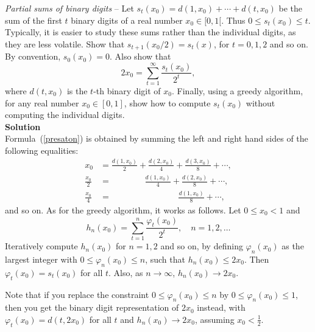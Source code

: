 \documentclass[oneside,10pt]{book}
\begin{document}
\begin{Exercise}\label{kn5z21990fr} {\em Partial sums of binary digits} --  Let $s_t(x_0) = d(1,x_0) +\cdots + d(t,x_0)$ be the sum of the first $t$ binary digits of a real number $x_0\in [0, 1[$. Thus $0\leq s_t(x_0)\leq t$. Typically, it is easier to study these sums rather than the individual digits, as they are less volatile.  Show that $s_{t+1}(x_0/2) = s_t(x)$, for $t=0,1,2$ and so on.  By convention, $s_0(x_0)=0$. Also show that 
\begin{equation}
 2x_0 = \sum_{t=1}^\infty \frac{s_t(x_0)}{2^t}, \label{presaton}
\end{equation}
where $d(t,x_0)$ is the $t$-th binary digit of $x_0$. Finally, using a \textcolor{index}{greedy algorithm}, for any real number $x_0\in[0, 1]$, show how to compute $s_t(x_0)$ without computing the individual digits.\vspace{1ex} \\ 
{\bf Solution} \\
Formula~(\ref{presaton}) is obtained by summing the left and right hand sides of the following equalities:
\begin{align}
x_0 & = \frac{d(1,x_0)}{2} +  \frac{d(2,x_0)}{4}+ \frac{d(3,x_0)}{8} + \cdots, \nonumber \\
\frac{x_0}{2} & =   \hspace{47pt}  \frac{d(1,x_0)}{4} +  \frac{d(2,x_0)}{8} + \cdots, \nonumber \\
\frac{x_0}{4} & =   \hspace{94pt}   \frac{d(1,x_0)}{8} + \cdots, \nonumber
\end{align}
and so on. As for the greedy algorithm, it works as follows. Let $0\leq x_0<1$ and
$$
h_n(x_0) = \sum_{t=1}^n \frac{\varphi_t(x_0)}{2^t}, \quad n=1,2,\dots
$$
Iteratively compute $h_n(x_0)$ for $n=1,2$ and so on, by defining
$\varphi_{n}(x_0)$ as the largest integer with $0\leq \varphi_{n}(x_0)\leq n$, such that $h_{n}(x_0) \leq 2x_0$. Then
 $\varphi_{t}(x_0)= s_t(x_0)$ for all $t$. Also, as $n\rightarrow\infty$, $h_n(x_0)\rightarrow 2x_0$. 

Note that if you replace 
the constraint $0\leq \varphi_{n}(x_0)\leq n$ by $0\leq \varphi_{n}(x_0)\leq 1$, 
then you get the binary digit representation of 
 $2x_0$ instead, with $\varphi_{t}(x_0)= d(t, 2x_0)$ for all $t$ and $h_n(x_0)\rightarrow 2x_0$, assuming $x_0<\frac{1}{2}$.  
\end{Exercise}
\end{document}
